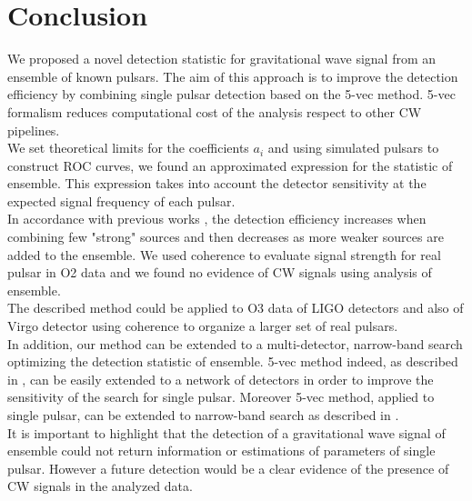 \documentclass[11pt,a4paper,final]{iopart}
\begin{document}
\section{Conclusion}\label{end}
We proposed a novel detection statistic for gravitational wave signal from an ensemble of known pulsars. The aim of this approach is to improve the detection efficiency by combining single pulsar detection based on the 5-vec method. 5-vec formalism reduces computational cost of the analysis respect to other CW pipelines. 
\\ We set theoretical limits for the coefficients $a_i$
 and using simulated pulsars to construct ROC curves, we found an approximated expression for the statistic of ensemble. This expression takes into account the detector sensitivity at the expected signal frequency of each pulsar.
\\In accordance with previous works \cite{Fstat2}, the detection efficiency increases when combining few "strong" sources and then decreases as more weaker sources are added to the ensemble. We used coherence to evaluate signal strength for real pulsar in O2 data and we found no evidence of CW signals using analysis of ensemble.
\\The described method could be applied to O3 data of LIGO detectors and also of Virgo detector using coherence to organize a larger set of real pulsars.
\\In addition, our method can be extended to a multi-detector, narrow-band search optimizing the detection statistic of ensemble. 5-vec method indeed, as described in \cite{5nvec}, can be easily extended to a network of detectors in order to improve the sensitivity of the search for single pulsar.
Moreover  5-vec method, applied to single pulsar, can be extended to narrow-band search as described in \cite{narrowband}. 
\\It is important to highlight that the detection of a gravitational wave signal of ensemble could not return information or estimations of parameters of single pulsar. However a future detection would be a clear evidence of the presence of CW signals in the analyzed data.
\clearpage

\appendix
\renewcommand{\theequation}{A.\arabic{equation}}
\end{document}
